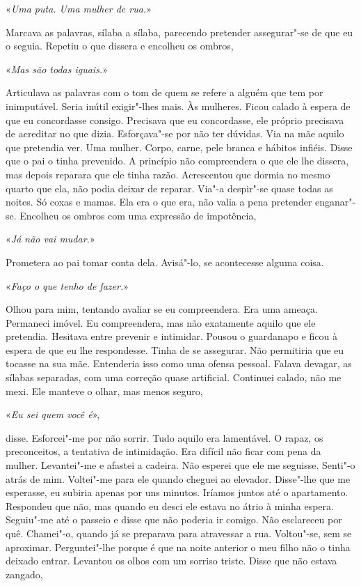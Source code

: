 «\emph{Uma puta. Uma mulher de rua.}»

Marcava as palavras, sílaba a sílaba, parecendo pretender assegurar"-se
de que eu o seguia. Repetiu o que dissera e encolheu os ombros,

«\emph{Mas são todas iguais.}»

Articulava as palavras com o tom de quem se refere a alguém que tem por
inimputável. Seria inútil exigir"-lhes mais. Às mulheres. Ficou calado à
espera de que eu concordasse consigo. Precisava que eu concordasse, ele
próprio precisava de acreditar no que dizia. Esforçava"-se por não ter
dúvidas. Via na mãe aquilo que pretendia ver. Uma mulher. Corpo, carne,
pele branca e hábitos infiéis. Disse que o pai o tinha prevenido. A
princípio não compreendera o que ele lhe dissera, mas depois reparara
que ele tinha razão. Acrescentou que dormia no mesmo quarto que ela, não
podia deixar de reparar. Via"-a despir"-se quase todas as noites. Só
coxas e mamas. Ela era o que era, não valia a pena pretender
enganar"-se. Encolheu os ombros com uma expressão de impotência,

«\emph{Já não vai mudar.}»

Prometera ao pai tomar conta dela. Avisá"-lo, se acontecesse alguma
coisa.

«\emph{Faço o que tenho de fazer.}»

Olhou para mim, tentando avaliar se eu compreendera. Era uma ameaça.
Permaneci imóvel. Eu compreendera, mas não exatamente aquilo que ele
pretendia. Hesitava entre prevenir e intimidar. Pousou o guardanapo e
ficou à espera de que eu lhe respondesse. Tinha de se assegurar. Não
permitiria que eu tocasse na sua mãe. Entenderia isso como uma ofensa
pessoal. Falava devagar, as sílabas separadas, com uma correção quase
artificial. Continuei calado, não me mexi. Ele manteve o olhar, mas
menos seguro,

«\emph{Eu sei quem você é}»,

disse. Esforcei"-me por não sorrir. Tudo aquilo era lamentável. O rapaz,
os preconceitos, a tentativa de intimidação. Era difícil não ficar com
pena da mulher. Levantei"-me e afastei a cadeira. Não esperei que ele me
seguisse. Senti"-o atrás de mim. Voltei"-me para ele quando cheguei ao
elevador. Disse"-lhe que me esperasse, eu subiria apenas por uns
minutos. Iríamos juntos até o apartamento. Respondeu que não, mas
quando eu desci ele estava no átrio à minha espera. Seguiu"-me até o
passeio e disse que não poderia ir comigo. Não esclareceu por quê.
Chamei"-o, quando já se preparava para atravessar a rua. Voltou"-se, sem
se aproximar. Perguntei"-lhe porque é que na noite anterior o meu filho
não o tinha deixado entrar. Levantou os olhos com um sorriso triste.
Disse que não estava zangado,

